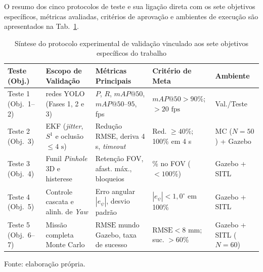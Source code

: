 O resumo dos cinco protocolos de teste e sua ligação direta com os sete objetivos específicos, métricas avaliadas, critérios de aprovação e ambientes de execução são apresentados na Tab.~\ref{tab:protocolo_testes_tcc}.

\begin{table}[H]
	\centering
	\footnotesize
	\setlength{\tabcolsep}{3pt}
	\captionsetup{justification=centering}
	\caption{Síntese do protocolo experimental de validação vinculado aos sete objetivos específicos do trabalho}
	\label{tab:protocolo_testes_tcc}
	\vspace{0.2cm}
	\begin{tabular}{>{\raggedright\arraybackslash}p{2.3cm}>{\raggedright\arraybackslash}p{3.6cm}>{\raggedright\arraybackslash}p{3.6cm}>{\raggedright\arraybackslash}p{3.0cm}>{\raggedright\arraybackslash}p{2.4cm}}
		\hline
		\textbf{Teste (Obj.)} & \textbf{Escopo de Validação} & \textbf{Métricas Principais} & \textbf{Critério de Meta} & \textbf{Ambiente} \\
		\hline
		Teste 1 (Obj.~1--2) & 4 redes YOLO (Fases 1, 2 e 3) & $P$, $R$, $mAP@50$, $mAP@50\text{--}95$, fps & $mAP@50 > 90\%$; $> 20\text{ fps}$ & Val./Teste \\
		Teste 2 (Obj.~3) & EKF (\textit{jitter}, $S^1$ e oclusão $\le 4\text{ s}$) & Redução RMSE, deriva 4 s, \textit{timeout} & Red. $\ge 40\%$; 100\% em 4 s & MC ($N=50$) + Gazebo \\
		Teste 3 (Obj.~4) & Funil \textit{Pinhole} 3D e histerese & Retenção FOV, afast. máx., bloqueios & 100\% no FOV ($< 100\%$) & Gazebo + SITL \\
		Teste 4 (Obj.~5) & Controle cascata e alinh. de \textit{Yaw} & Erro angular $|e_\psi|$, desvio padrão & $|e_\psi| < 1{,}0^\circ$ em 100\% & Gazebo + SITL \\
		Teste 5 (Obj.~6--7) & Missão completa Monte Carlo & $\text{RMSE}$ mundo Gazebo, taxa de sucesso & $\text{RMSE} < 8\text{ mm}$; suc. $> 60\%$ & Gazebo + SITL ($N=60$) \\
		\hline
	\end{tabular}
	\vspace{0.2cm}
	\begin{flushleft}
		\footnotesize Fonte: elaboração própria.
	\end{flushleft}
\end{table}